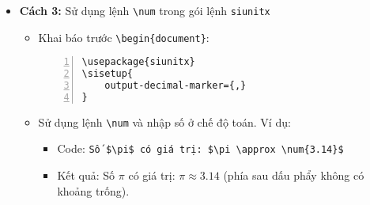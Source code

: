 \documentclass[12pt,a4paper]{article}
\begin{document}
\begin{itemize}
			\item \textbf{Cách 3:} Sử dụng lệnh \Verb|\num| trong gói lệnh \Verb|siunitx|
				\begin{itemize}
					\item Khai báo trước \Verb|\begin{document}|:
\begin{Verbatim}[xleftmargin=10mm, numbers=left]
\usepackage{siunitx}
\sisetup{
	output-decimal-marker={,}
}
\end{Verbatim}
					\item Sử dụng lệnh \Verb|\num| và nhập số ở chế độ toán. Ví dụ:
						\begin{itemize}
							\item Code: \Verb|Số $\pi$ có giá trị: $\pi \approx \num{3.14}$|

							\item Kết quả: Số $\pi$ có giá trị: $\pi \approx \num{3.14}$ (phía sau dấu phẩy không có khoảng trống).						
						\end{itemize}
				\end{itemize}
		\end{itemize}
\end{document}
